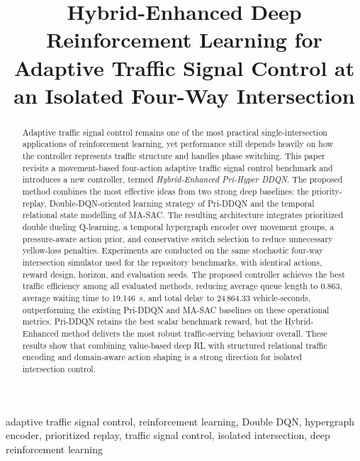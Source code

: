 \documentclass[conference]{IEEEtran}
\begin{document}
\title{Hybrid-Enhanced Deep Reinforcement Learning for Adaptive Traffic Signal Control at an Isolated Four-Way Intersection}

\author{
}

\maketitle

\begin{abstract}
Adaptive traffic signal control remains one of the most practical
single-intersection applications of reinforcement learning, yet
performance still depends heavily on how the controller represents
traffic structure and handles phase switching. This paper revisits a
movement-based four-action adaptive traffic signal control benchmark
and introduces a new controller, termed
\emph{Hybrid-Enhanced Pri-Hyper DDQN}. The proposed method combines
the most effective ideas from two strong deep baselines: the
priority-replay, Double-DQN-oriented learning strategy of Pri-DDQN
and the temporal relational state modelling of MA-SAC. The resulting
architecture integrates prioritized double dueling Q-learning, a
temporal hypergraph encoder over movement groups, a pressure-aware
action prior, and conservative switch selection to reduce unnecessary
yellow-loss penalties. Experiments are conducted on the same
stochastic four-way intersection simulator used for the repository
benchmarks, with identical actions, reward design, horizon, and
evaluation seeds. The proposed controller achieves the best traffic
efficiency among all evaluated methods, reducing average queue length
to 0.863, average waiting time to 19.146~s, and total delay to
24\,864.33 vehicle-seconds, outperforming the existing Pri-DDQN and
MA-SAC baselines on these operational metrics. Pri-DDQN retains the
best scalar benchmark reward, but the Hybrid-Enhanced method delivers
the most robust traffic-serving behaviour overall. These results show
that combining value-based deep RL with structured relational traffic
encoding and domain-aware action shaping is a strong direction for
isolated intersection control.
\end{abstract}

\begin{IEEEkeywords}
adaptive traffic signal control, reinforcement learning, Double DQN,
hypergraph encoder, prioritized replay, traffic signal control,
isolated intersection, deep reinforcement learning
\end{IEEEkeywords}
\end{document}
